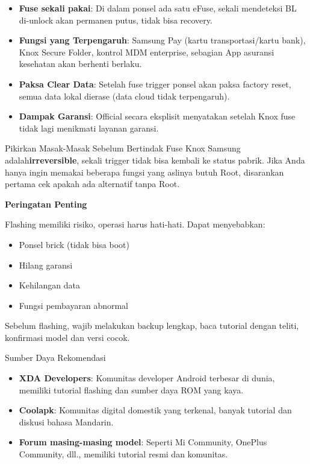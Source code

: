\begin{itemize}
  \item \textbf{Fuse sekali pakai}: Di dalam ponsel ada satu eFuse, sekali mendeteksi BL di-unlock akan permanen putus, tidak bisa recovery.
  \item \textbf{Fungsi yang Terpengaruh}: Samsung Pay (kartu transportasi/kartu bank), Knox Secure Folder, kontrol MDM enterprise, sebagian App asuransi kesehatan akan berhenti berlaku.
  \item \textbf{Paksa Clear Data}: Setelah fuse trigger ponsel akan paksa factory reset, semua data lokal dierase (data cloud tidak terpengaruh).
  \item \textbf{Dampak Garansi}: Official secara eksplisit menyatakan setelah Knox fuse tidak lagi menikmati layanan garansi.
\end{itemize}

\begin{tcbwarn}{Pikirkan Masak-Masak Sebelum Bertindak}
Fuse Knox Samsung adalah\textbf{irreversible}, sekali trigger tidak bisa kembali ke status pabrik. Jika Anda hanya ingin memakai beberapa fungsi yang aslinya butuh Root, disarankan pertama cek apakah ada alternatif tanpa Root.

\end{tcbwarn}

\textbf{Peringatan Penting}\par

Flashing memiliki risiko, operasi harus hati-hati. Dapat menyebabkan:

\begin{itemize}
  \item Ponsel brick (tidak bisa boot)
  \item Hilang garansi
  \item Kehilangan data
  \item Fungsi pembayaran abnormal
\end{itemize}

Sebelum flashing, wajib melakukan backup lengkap, baca tutorial dengan teliti, konfirmasi model dan versi cocok.

\begin{tcbinfo}{Sumber Daya Rekomendasi}
\begin{itemize}
  \item \textbf{XDA Developers}: Komunitas developer Android terbesar di dunia, memiliki tutorial flashing dan sumber daya ROM yang kaya.
  \item \textbf{Coolapk}: Komunitas digital domestik yang terkenal, banyak tutorial dan diskusi bahasa Mandarin.
  \item \textbf{Forum masing-masing model}: Seperti Mi Community, OnePlus Community, dll., memiliki tutorial resmi dan komunitas.
\end{itemize}

\end{tcbinfo}

